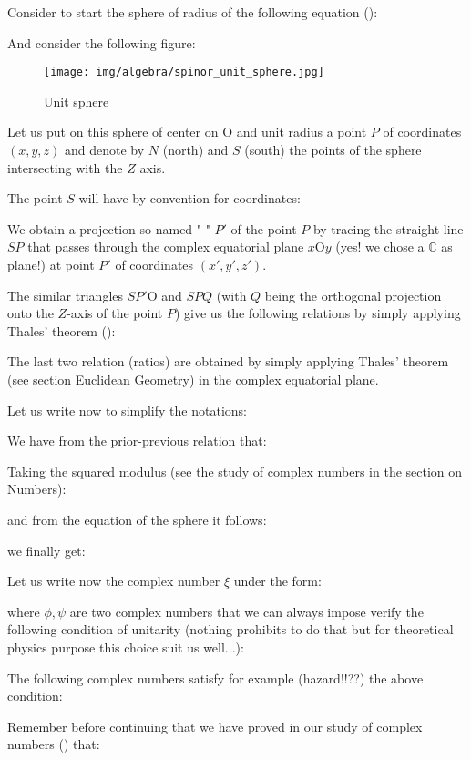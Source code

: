 	Consider to start the sphere of radius of the following equation ():
	
	And consider the following figure:
\begin{figure}[H]
\centering
\texttt{[image: img/algebra/spinor\_unit\_sphere.jpg]}
\caption[]{Unit sphere}
\end{figure}
Let us put on this sphere of center on O and unit radius a point $P$ of coordinates $(x,y,z)$  and denote by $N$ (north) and $S$ (south) the points of the sphere intersecting with the $Z$ axis.

The point $S$ will have by convention for coordinates:
	
We obtain a projection so-named " " $P'$ of the point $P$ by tracing the straight line $SP$ that passes through the complex equatorial plane $x\text{O}y$  (yes! we chose a $\mathbb{C}$ as plane!) at point $P'$ of coordinates $(x', y', z')$.

The similar triangles $SP'\text{O}$ and $SPQ$ (with $Q$ being the orthogonal projection onto the $Z$-axis of the point $P$) give us the following relations by simply applying Thales' theorem ():
	
	
	\begin{tcolorbox}[title=Remark,colframe=black,arc=10pt]
The last two relation (ratios) are obtained by simply applying Thales' theorem (see section Euclidean Geometry) in the complex equatorial plane.
	\end{tcolorbox}
	
	Let us write now to simplify the notations:
	
	We have from the prior-previous relation that:
	
	Taking the squared modulus (see the study of complex numbers in the section on Numbers):
	
	and from  the equation of the sphere it follows:
	
	we finally get:
	
	Let us write now the complex number $\xi$ under the form:
	
	
	 where $\phi,\psi$ are two complex numbers that we can always impose verify the following condition of unitarity (nothing prohibits to do that but for theoretical physics purpose this choice suit us well...):
	
	\begin{tcolorbox}[title=Remark,colframe=black,arc=10pt]
		The following complex numbers satisfy for example (hazard!!??)  the above condition:
		
	\end{tcolorbox}	
	Remember before continuing that we have proved in our study of complex numbers () that:
	
